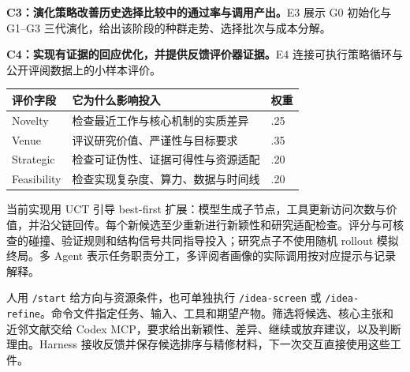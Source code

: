 \textbf{C3：演化策略改善历史选择比较中的通过率与调用产出。}E3 展示 G0 初始化与 G1--G3 三代演化，给出该阶段的种群走势、选择批次与成本分解。

\textbf{C4：实现有证据的回应优化，并提供反馈评价器证据。}E4 连接可执行策略循环与公开评阅数据上的小样本评价。

\begin{center}\small
\begin{tabularx}{\textwidth}{P{28mm}Y P{16mm}}
\toprule
\textbf{评价字段} & \textbf{它为什么影响投入} & \textbf{权重}\\
\midrule
Novelty & 检查最近工作与核心机制的实质差异 & .25\\
Venue & 评议研究价值、严谨性与目标要求 & .35\\
Strategic & 检查可证伪性、证据可得性与资源适配 & .20\\
Feasibility & 检查实现复杂度、算力、数据与时间线 & .20\\
\bottomrule
\end{tabularx}
\end{center}

当前实现用 UCT 引导 best-first 扩展：模型生成子节点，工具更新访问次数与价值，并沿父链回传。每个新候选至少重新进行新颖性和研究适配检查。评分与可核查的碰撞、验证规则和结构信号共同指导投入；研究点子不使用随机 rollout 模拟终局。多 Agent 表示任务职责分工，多评阅者画像的实际调用按对应提示与记录解释。

人用 \texttt{/start} 给方向与资源条件，也可单独执行 \texttt{/idea-screen} 或 \texttt{/idea-refine}。命令文件指定任务、输入、工具和期望产物。筛选将候选、核心主张和近邻文献交给 Codex MCP，要求给出新颖性、差异、继续或放弃建议，以及判断理由。Harness 接收反馈并保存候选排序与精修材料，下一次交互直接使用这些工件。


